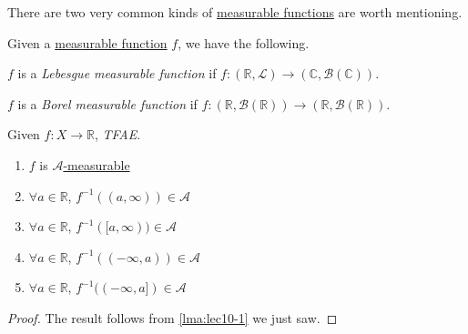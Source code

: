 There are two very common kinds of \hyperref[def:measurable-function]{measurable functions} are worth mentioning.
\begin{definition*}
	Given a \hyperref[def:measurable-function]{measurable function} \(f\), we have the following.
	\begin{definition}\label{def:Lebesgue-measurable-function}
		\(f\) is a \emph{Lebesgue measurable function} if \(f\colon (\mathbb{R} , \mathcal{L} ) \to (\mathbb{C} , \mathcal{B} (\mathbb{C}))\).
	\end{definition}

	\begin{definition}\label{def:Borel-measurable-function}
		\(f\) is a \emph{Borel measurable function} if \(f\colon (\mathbb{R} , \mathcal{B} (\mathbb{R} ))\to (\mathbb{R} , \mathcal{B} (\mathbb{R} ))\).
	\end{definition}
\end{definition*}


\begin{lemma}\label{lma:lec10-2}
	Given \(f\colon X\to \mathbb{R} \), \emph{TFAE}.
	\begin{enumerate}[(1)]
		\item \(f\) is \hyperref[def:A-measurable-function]{\(\mathcal{A}\)-measurable}
		\item \(\forall a\in\mathbb{R} \), \(f^{-1} ((a, \infty ))\in\mathcal{A} \)
		\item \(\forall a\in\mathbb{R} \), \(f^{-1} ([a, \infty ))\in\mathcal{A} \)
		\item \(\forall a\in\mathbb{R} \), \(f^{-1} ((-\infty, a))\in\mathcal{A} \)
		\item \(\forall a\in\mathbb{R} \), \(f^{-1} ((-\infty, a])\in\mathcal{A} \)
	\end{enumerate}
\end{lemma}
\begin{proof}
	The result follows from \autoref{lma:lec10-1} we just saw.
\end{proof}


